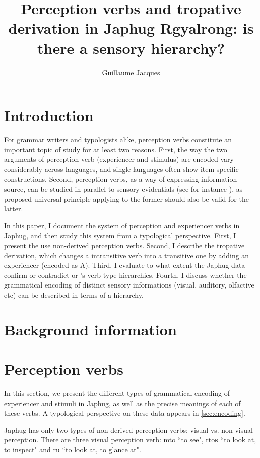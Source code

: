 \documentclass[oldfontcommands,oneside,a4paper,11pt]{article}
\newcommand{\ipa}[1]{{\phon #1}} %
\begin{document}
 

\title{Perception verbs and tropative derivation in Japhug Rgyalrong: is there a sensory hierarchy?}
\author{Guillaume Jacques}
\maketitle

\section{Introduction}
For grammar writers and typologists alike, perception verbs constitute an important topic of study for at least two reasons. First, the way the two arguments of perception verb (experiencer and stimulus) are encoded vary considerably across languages, and single languages often show item-specific constructions. Second, perception verbs, as a way of expressing information source, can be studied in parallel to sensory evidentials (see for instance \citealt{aikhenvald13knowledge}), as proposed universal principle applying to the former should also be valid for the latter.

In this paper, I document the system of perception and experiencer verbs in Japhug, and then study this system from a typological perspective. First, I present the use non-derived perception verbs. Second, I describe the tropative derivation, which changes a intransitive verb into a transitive  one by adding an experiencer (encoded as A). Third, I evaluate to what extent the Japhug data confirm or contradict \citet{tsunoda85tr} or \citet{malchukov05competition}'s verb type hierarchies. Fourth, I discuss   whether the grammatical encoding of distinct sensory informations (visual, auditory, olfactive etc) can be described in terms of a hierarchy.


\section{Background information}
\section{Perception verbs} \label{sec:perception}
 In this section, we present the different types of grammatical encoding of experiencer and stimuli in Japhug, as well as the precise meanings of each of these verbs. A typological perspective on these data appears in \ref{sec:encoding}.


Japhug has only two types of non-derived perception verbs: visual vs. non-visual perception. There are three visual perception verb: \ipa{mto}	``to see", \ipa{rtoʁ} ``to look at, to inspect" and \ipa{ru}	 ``to look at, to glance at".
\end{document}
